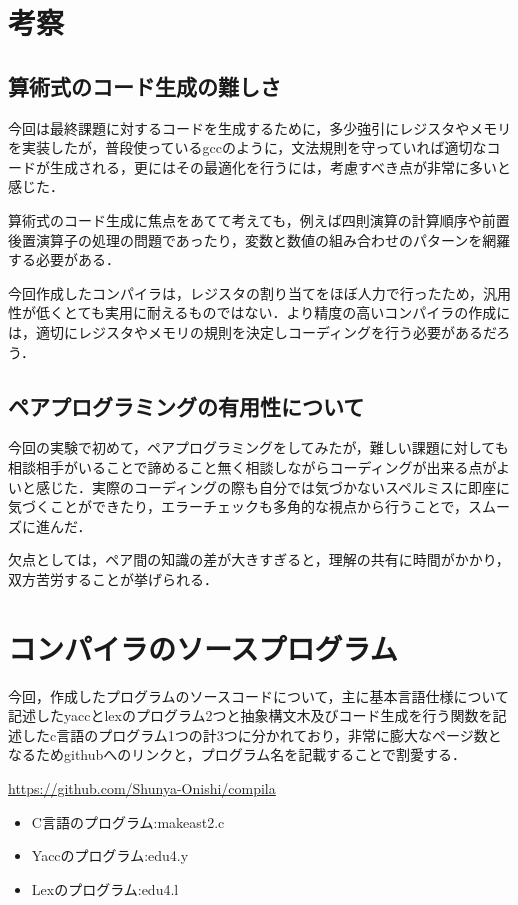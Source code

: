 \documentclass[a4j]{jarticle}
\begin{document}
\section{考察}
\subsection{算術式のコード生成の難しさ}
今回は最終課題に対するコードを生成するために，多少強引にレジスタやメモリを実装したが，普段使っているgccのように，文法規則を守っていれば適切なコードが生成される，更にはその最適化を行うには，考慮すべき点が非常に多いと感じた．

算術式のコード生成に焦点をあてて考えても，例えば四則演算の計算順序や前置後置演算子の処理の問題であったり，変数と数値の組み合わせのパターンを網羅する必要がある．

今回作成したコンパイラは，レジスタの割り当てをほぼ人力で行ったため，汎用性が低くとても実用に耐えるものではない．より精度の高いコンパイラの作成には，適切にレジスタやメモリの規則を決定しコーディングを行う必要があるだろう．

\subsection{ペアプログラミングの有用性について}
今回の実験で初めて，ペアプログラミングをしてみたが，難しい課題に対しても相談相手がいることで諦めること無く相談しながらコーディングが出来る点がよいと感じた．実際のコーディングの際も自分では気づかないスペルミスに即座に気づくことができたり，エラーチェックも多角的な視点から行うことで，スムーズに進んだ．

欠点としては，ペア間の知識の差が大きすぎると，理解の共有に時間がかかり，双方苦労することが挙げられる．

\section{コンパイラのソースプログラム}

今回，作成したプログラムのソースコードについて，主に基本言語仕様について記述したyaccとlexのプログラム2つと抽象構文木及びコード生成を行う関数を記述したc言語のプログラム1つの計3つに分かれており，非常に膨大なページ数となるためgithubへのリンクと，プログラム名を記載することで割愛する．

\url{https://github.com/Shunya-Onishi/compila}

\begin{itemize}
\item C言語のプログラム:makeast2.c 
\item Yaccのプログラム:edu4.y
\item Lexのプログラム:edu4.l 
\end{itemize}
\end{document}
